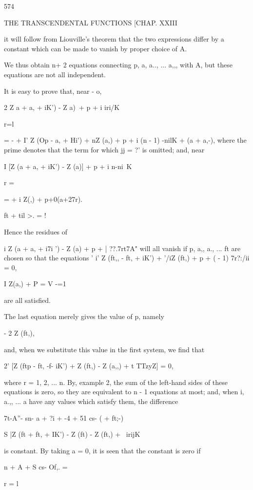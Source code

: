 {{{{{{{{574

THE TRANSCENDENTAL FUNCTIONS [CHAP. XXIII

it will follow from Liouville's theorem that the two expressions
differ by a constant which can be made to vanish by proper choice of
A.

We thus obtain n+ 2 equations connecting p, a, a.., ... a,,, with A,
but these equations are not all independent.

It is easy to prove that, near - o,

2 Z a + a, + iK') - Z a)\ + p + i iri/K

r=l

= - + I' Z (Op - a, + Hi') + nZ (a,) + p + i (n - 1) -nilK + (a +
a,-), where the prime denotes that the term for which jj = ?' is
omitted; and, near

I [Z (a + a, + iK') - Z (a)] + p + i n-ni\ K

r = \

= + i Z(,) + p+0(a+27r).

ft + til >. = !

Hence the residues of

i Z (a + a, + i7i ') - Z (a) + p + | ??.7rt7A" will all vanish if p,
a,, a., ... ft are chosen so that the equations ' i' Z (ft,, - ft, +
iK') + '/iZ (ft,) + p + ( - 1) 7r?:/ii = 0,

I Z(a,) + P = V -=1

are all satisfied.

The last equation merely gives the value of p, namely

- 2 Z (ft,),

and, when we substitute this value in the first system, we find that

2' [Z (ftp - ft, -f- iK') + Z (ft,) - Z (a,,) + t TTzyZ] = 0,

where r = 1, 2, ... n. By, example 2, the sum of the
left-hand sides of these equations is zero, so they are equivalent to
n - 1 equations at most; and, when i, a.,, ... a have any values
which satisfy them, the difference

7t-A''- sn- a + ?i + -4 + 51 cs- ( + ft;-)

S |Z (ft + ft, + IK') - Z (ft) - Z (ft,) + \ irijK\

%
%

is constant. By taking a = 0, it is seen that the constant is zero if

n + A + S cs- Of,. =

r = l

}}}}}}}}
